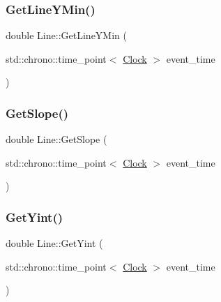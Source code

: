 \mbox{\label{classLine_ae8151f5f3b102924b09de686f536e220}} 
\subsubsection{\texorpdfstring{Get\+Line\+Y\+Min()}{GetLineYMin()}}
{\footnotesize\ttfamily double Line\+::\+Get\+Line\+Y\+Min (\begin{DoxyParamCaption}\item[{std\+::chrono\+::time\+\_\+point$<$ \mbox{\hyperlink{universe_8h_a0ef8d951d1ca5ab3cfaf7ab4c7a6fd80}{Clock}} $>$}]{event\+\_\+time }\end{DoxyParamCaption})\hspace{0.3cm}{\ttfamily [inline]}}

\mbox{\label{classLine_a2be3926d47a1a8849007a6c29a603dcf}} 
\subsubsection{\texorpdfstring{Get\+Slope()}{GetSlope()}}
{\footnotesize\ttfamily double Line\+::\+Get\+Slope (\begin{DoxyParamCaption}\item[{std\+::chrono\+::time\+\_\+point$<$ \mbox{\hyperlink{universe_8h_a0ef8d951d1ca5ab3cfaf7ab4c7a6fd80}{Clock}} $>$}]{event\+\_\+time }\end{DoxyParamCaption})\hspace{0.3cm}{\ttfamily [inline]}}

\mbox{\label{classLine_a5319d68ecb254ff61e2a46d5928aec93}} 
\subsubsection{\texorpdfstring{Get\+Yint()}{GetYint()}}
{\footnotesize\ttfamily double Line\+::\+Get\+Yint (\begin{DoxyParamCaption}\item[{std\+::chrono\+::time\+\_\+point$<$ \mbox{\hyperlink{universe_8h_a0ef8d951d1ca5ab3cfaf7ab4c7a6fd80}{Clock}} $>$}]{event\+\_\+time }\end{DoxyParamCaption})\hspace{0.3cm}{\ttfamily [inline]}}

